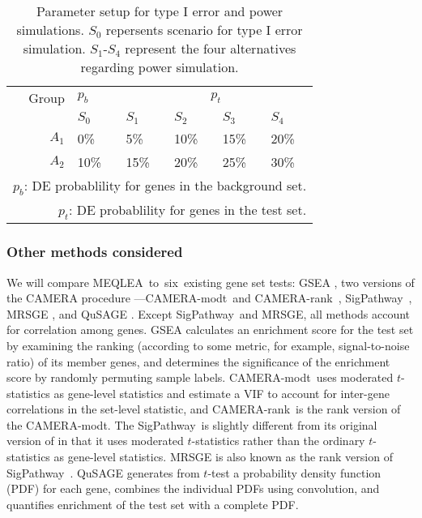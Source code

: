 \documentclass[useAMS,usenatbib, galley]{biom}
\newcommand{\OurMethod}{MEQLEA}
\newcommand{\HowmanyTest}{six}
\newcommand{\CMR}{CAMERA-rank}
\newcommand{\CMT}{CAMERA-modt}
\newcommand{\gent}{SigPathway}
\begin{document}
		
		\begin{table}[!ht]
			\centering
			\caption{Parameter setup for type I error and power simulations. $S_0$ repersents scenario for type I error simulation. $S_1$-$S_4$ represent the four alternatives regarding power simulation.}
			\begin{tabular}{rp{1cm}p{1cm}p{1cm}p{1cm}p{1cm}}
				\hline\hline
				Group & $p_b$ &  \multicolumn{4}{c}{$p_t$}  \\ 
				\cline{3-6}
				& $S_0$  & $S_1$ & $S_2$ & $S_3$ & $S_4$\\ 
				\hline
				$A_1$ & 0\%   & 5\% & 10\% & 15\% & 20\%\\ 
				$A_2$ & 10\%  & 15\%& 20\%& 25\% & 30\%\\ 
				\hline\hline
				\multicolumn{6}{p{8cm}}{$p_b$: DE probablility for genes in the background set. }	 \\	
				\multicolumn{6}{p{8cm}}{$p_t$: DE probablility for genes in the test set. }	 \\	
			\end{tabular}
			\label{table:simusetup}
		\end{table}
	
		\subsubsection{Other methods considered}
		
		We will compare \OurMethod~to~\HowmanyTest~existing gene set tests: GSEA \citep{subramanian2005gene}, two versions of the CAMERA procedure ---\CMT~and \CMR~\citep{wu2012camera}, \gent~\citep{tian2005discovering}, MRSGE \citep{michaud2008integrative}, and QuSAGE \citep{yaari2013quantitative}. Except \gent~and MRSGE, all methods account for correlation among genes. GSEA calculates an enrichment score for the test set by examining the ranking (according to some metric, for example, signal-to-noise ratio) of its member genes, and determines the significance of the enrichment score by randomly permuting sample labels. \CMT~uses moderated $t$-statistics \citep{Smyth2004moderated} as gene-level statistics and estimate a VIF to account for inter-gene correlations in the set-level statistic, and \CMR~is the rank version of the \CMT. The \gent~is slightly different from its original version of \cite{tian2005discovering} in that it uses moderated $t$-statistics rather than the ordinary $t$-statistics as gene-level statistics. MRSGE is also known as the rank version of \gent~\citep{wu2012camera}. QuSAGE generates from $t$-test a probability density function (PDF) for each gene, combines the individual PDFs using convolution, and quantifies enrichment of the test set with a complete PDF. 
		
\end{document}
